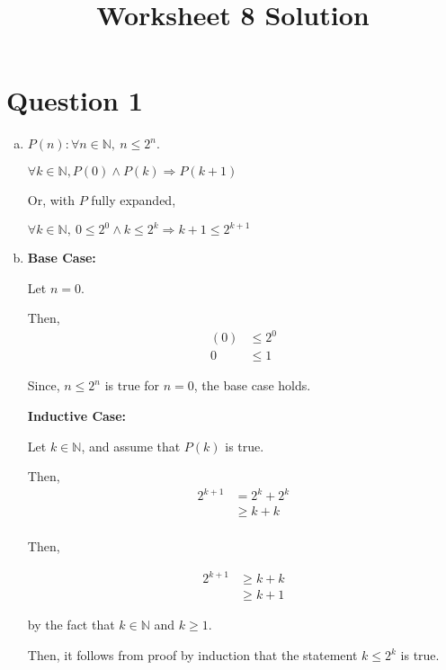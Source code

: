 \documentclass[12pt]{article}
\begin{document}
\title{Worksheet 8 Solution}
\maketitle

\section*{Question 1}
\begin{enumerate}[a.]
    \item

    $P(n): \forall n \in \mathbb{N},\: n \leq 2^{n}$.

    $\forall k \in \mathbb{N}, P(0) \land P(k) \Rightarrow P(k+1)$

    \bigskip

    Or, with $P$ fully expanded,

    $\forall k \in \mathbb{N},\:0 \leq 2^0 \land k \leq 2^k \Rightarrow k+1 \leq
    2^{k+1}$

    \item

    \textbf{Base Case:}

    \bigskip

    Let $n = 0$.

    \bigskip

    Then,
    \setcounter{equation}{0}
    \begin{align}
        (0) &\leq 2^0\\
        0 &\leq 1
    \end{align}

    \bigskip

    Since, $n \leq 2^n$ is true for $n = 0$, the base case holds.

    \bigskip

    \textbf{Inductive Case:}

    \bigskip

    Let $k \in \mathbb{N}$, and assume that $P(k)$ is true.

    \bigskip

    Then,
    \setcounter{equation}{0}
    \begin{align}
        2^{k+1} &= 2^k + 2^k\\
        &\geq k + k\\
    \end{align}

    Then,

    \begin{align}
        2^{k+1} &\geq k + k\\
        &\geq k + 1
    \end{align}

    by the fact that $k \in \mathbb{N}$ and $k \geq 1$.

    \bigskip

    Then, it follows from proof by induction that the statement $k \leq 2^k$ is
    true.

\end{enumerate}
\end{document}
